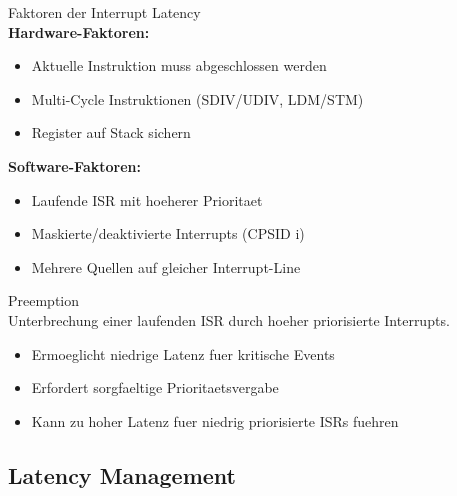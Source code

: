 \begin{concept}{Faktoren der Interrupt Latency}\\
    \textbf{Hardware-Faktoren:}
    \begin{itemize}
        \item Aktuelle Instruktion muss abgeschlossen werden
        \item Multi-Cycle Instruktionen (SDIV/UDIV, LDM/STM)
        \item Register auf Stack sichern
    \end{itemize}
    
    \textbf{Software-Faktoren:}
    \begin{itemize}
        \item Laufende ISR mit hoeherer Prioritaet
        \item Maskierte/deaktivierte Interrupts (CPSID i)
        \item Mehrere Quellen auf gleicher Interrupt-Line
    \end{itemize}
\end{concept}

\begin{concept}{Preemption}\\
    Unterbrechung einer laufenden ISR durch hoeher priorisierte Interrupts.
    \begin{itemize}
        \item Ermoeglicht niedrige Latenz fuer kritische Events
        \item Erfordert sorgfaeltige Prioritaetsvergabe
        \item Kann zu hoher Latenz fuer niedrig priorisierte ISRs fuehren
    \end{itemize}
\end{concept}

\subsection{Latency Management}

